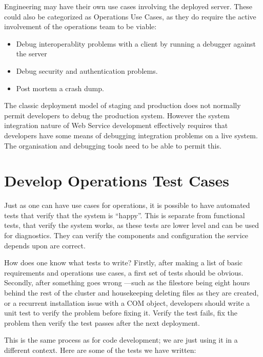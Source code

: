 \documentclass[draft]{report}
\begin{document}
Engineering may have their own use cases involving the deployed server.
These could also be categorized as Operations Use Cases, as they do
require the active involvement of the operations team to be viable:

\begin{itemize}

\item Debug interoperablity problems with a client by running a debugger
against the server

\item Debug security and authentication problems.

\item Post mortem a crash dump.

\end{itemize}

The classic deployment model of staging and production does not normally
permit developers to debug the production system. However the system
integration nature of Web Service development effectively requires that
developers have some means of debugging integration problems on a live
system. The organisation and debugging tools need to be able to permit
this. 

\section{Develop Operations Test Cases}

Just as one can have use cases for operations, it is possible to have
automated tests that verify that the system is ``happy''. This is
separate from functional tests, that verify the system works, as these
tests are lower level and can be used for diagnostics. They can verify
the components and configuration the service depends upon are correct.

How does one know what tests to write? Firstly, after making a list of
basic requirements and operations use cases, a first set of tests should
be obvious. Secondly, after something goes wrong ---such as the
filestore being eight hours behind the rest of the cluster and
housekeeping deleting files as they are created, or a recurrent
installation issue with a COM object, developers should write a unit
test to verify the problem before fixing it. Verify the test fails, fix
the problem then verify the test passes after the next deployment.

This is the same process as for code development; we are just using it
in a different context. Here are some of the tests we have written:
\end{document}
